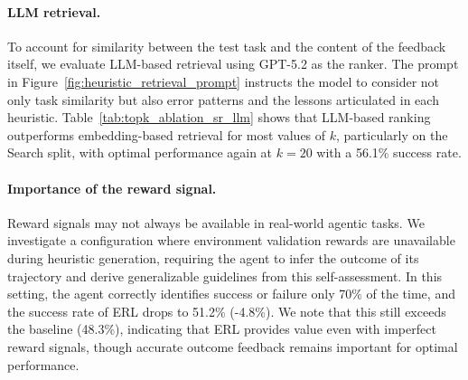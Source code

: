 \documentclass{article}
\begin{document}
\paragraph{LLM retrieval.}
To account for similarity between the test task and the content of the feedback itself, we evaluate LLM-based retrieval using GPT-5.2 as the ranker. The prompt in Figure~\ref{fig:heuristic_retrieval_prompt} instructs the model to consider not only task similarity but also error patterns and the lessons articulated in each heuristic. Table~\ref{tab:topk_ablation_sr_llm} shows that LLM-based ranking outperforms embedding-based retrieval for most values of $k$, particularly on the Search split, with optimal performance again at $k=20$ with a 56.1\% success rate.

\paragraph{Importance of the reward signal.}
Reward signals may not always be available in real-world agentic tasks. We investigate a configuration where environment validation rewards are unavailable during heuristic generation, requiring the agent to infer the outcome of its trajectory and derive generalizable guidelines from this self-assessment. In this setting, the agent correctly identifies success or failure only 70\% of the time, and the success rate of ERL drops to 51.2\% (-4.8\%). We note that this still exceeds the baseline (48.3\%), indicating that ERL provides value even with imperfect reward signals, though accurate outcome feedback remains important for optimal performance.
\end{document}
